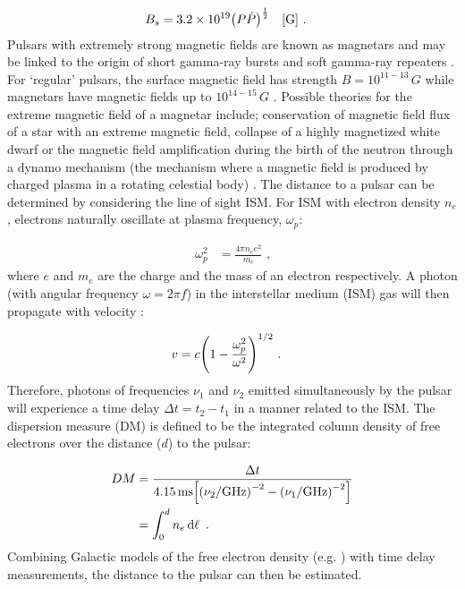 \begin{equation}
    \begin{aligned}
    B_s&=3.2\times 10^{19}\qty(P\dot{P})^\half\quad\qty[\si{G}]\text{ .}
    \end{aligned}
\end{equation}
\noindent Pulsars with extremely strong magnetic fields are known as magnetars and may be linked to the origin of short gamma-ray bursts and soft gamma-ray repeaters \citep{1992ApJ...392L...9D}. For `regular' pulsars, the surface magnetic field has strength $B=10^{11-13}\,\si{G}$ while magnetars have magnetic fields up to $10^{14-15}\,\si{G}$ \citep{2007ASSL..326.....H}. Possible theories for the extreme magnetic field of a magnetar include; conservation of magnetic field flux of a star with an extreme magnetic field, collapse of a highly magnetized white dwarf or the magnetic field amplification during the birth of the neutron through a dynamo mechanism (the mechanism where a magnetic field is produced by charged plasma in a rotating celestial body) \citep{1992ApJ...392L...9D, 1993_magnetar, 1996AIPC..366..111D}.
\newpar
The distance to a pulsar can be determined by considering the line of sight ISM. For ISM with electron density $n_e$, electrons naturally oscillate at plasma frequency, $\omega_p$:

\begin{equation}
    \begin{aligned}
        \omega_p^2&=\frac{4\pi n_ee^2}{m_e}\text{ ,}
    \end{aligned}
\end{equation}
\noindent where $e$ and $m_e$ are the charge and the mass of an electron respectively. A photon (with angular frequency $\omega=2\pi f$) in the interstellar medium (ISM) gas will then propagate with velocity \citep{2011piim.book.....D}:

\begin{equation}
    \begin{aligned}
        v&=c\qty(1-\frac{\omega_p^2}{\omega^2})^{1/2}\text{ .}
    \end{aligned}
\end{equation}
\noindent Therefore, photons of frequencies $\nu_1$ and $\nu_2$ emitted simultaneously by the pulsar will experience a time delay $\Delta t= t_2-t_1$ in a manner related to the ISM. The dispersion measure (DM) is defined to be the integrated column density of free electrons over the distance ($d$) to the pulsar\citep{2011piim.book.....D}:

\begin{equation}
    \begin{aligned}
        DM&= \frac{\Delta t}{4.15\,\si{\milli\second}\qty[\qty(\nu_2/\si{\giga\hertz})^{-2}-\qty(\nu_1/\si{\giga\hertz})^{-2}]}\\
        &= \int_0^dn_e \dd{\ell}\text{ .}
    \end{aligned} \label{eq:chapter_1_dispersion_measurement}
\end{equation}
\noindent Combining Galactic models of the free electron density (e.g. \cite{2017ApJ...835...29Y}) with time delay measurements, the distance to the pulsar can then be estimated.
 
